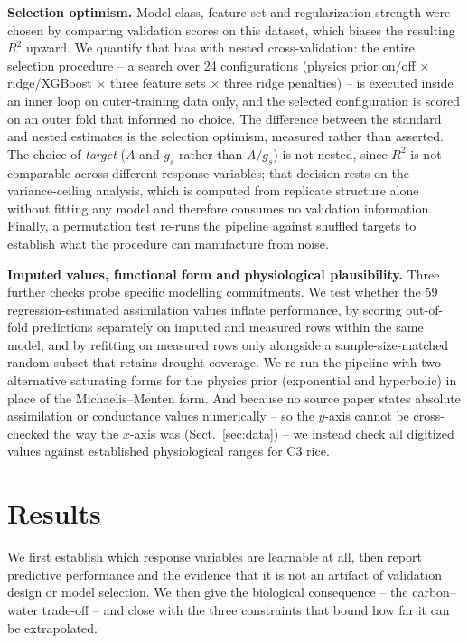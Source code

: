 \documentclass[runningheads]{llncs}
\begin{document}
\textbf{Selection optimism.} Model class, feature set and regularization strength were chosen by comparing validation scores on this dataset, which biases the resulting $R^{2}$ upward. We quantify that bias with nested cross-validation: the entire selection procedure -- a search over 24 configurations (physics prior on/off $\times$ ridge/XGBoost $\times$ three feature sets $\times$ three ridge penalties) -- is executed inside an inner loop on outer-training data only, and the selected configuration is scored on an outer fold that informed no choice. The difference between the standard and nested estimates is the selection optimism, measured rather than asserted. The choice of \emph{target} ($A$ and $g_s$ rather than $A/g_s$) is not nested, since $R^{2}$ is not comparable across different response variables; that decision rests on the variance-ceiling analysis, which is computed from replicate structure alone without fitting any model and therefore consumes no validation information. Finally, a permutation test re-runs the pipeline against shuffled targets to establish what the procedure can manufacture from noise.

\textbf{Imputed values, functional form and physiological plausibility.} Three further checks probe specific modelling commitments. We test whether the 59 regression-estimated assimilation values inflate performance, by scoring out-of-fold predictions separately on imputed and measured rows within the same model, and by refitting on measured rows only alongside a sample-size-matched random subset that retains drought coverage. We re-run the pipeline with two alternative saturating forms for the physics prior (exponential and hyperbolic) in place of the Michaelis--Menten form. And because no source paper states absolute assimilation or conductance values numerically -- so the $y$-axis cannot be cross-checked the way the $x$-axis was (Sect.~\ref{sec:data}) -- we instead check all digitized values against established physiological ranges for C3 rice.

\section{Results}\label{sec:results}

We first establish which response variables are learnable at all, then report predictive performance and the evidence that it is not an artifact of validation design or model selection. We then give the biological consequence -- the carbon--water trade-off -- and close with the three constraints that bound how far it can be extrapolated.
\end{document}
